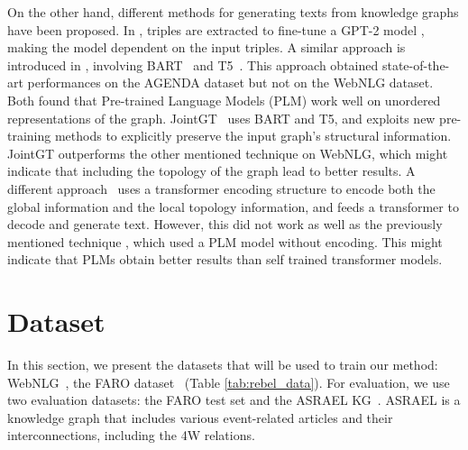 \documentclass[
hf, %
]{ceurart}
\begin{document}
On the other hand, different methods for generating texts from knowledge graphs have been proposed. In \cite{creative_story}, triples are extracted to fine-tune a GPT-2 model \cite{GPT-2}, making the model dependent on the input triples. A similar approach is introduced in \cite{inv_PLM}, involving BART~\cite{BART} and T5~\cite{T5}. This approach obtained state-of-the-art performances on the AGENDA dataset \cite{AGENDA_KG} but not on the WebNLG dataset. Both found that Pre-trained Language Models (PLM) work well on unordered representations of the graph. JointGT~\cite{JointGT} uses BART and T5, and exploits new pre-training methods to explicitly preserve the input graph's structural information. JointGT outperforms the other mentioned technique on WebNLG, which might indicate that including the topology of the graph lead to better results. A different approach~\cite{DRAW} uses a transformer encoding structure to encode both the global information and the local topology information, and feeds a transformer to decode and generate text. However, this did not work as well as the previously mentioned technique \cite{inv_PLM}, which used a PLM model without encoding. This might indicate that PLMs obtain better results than self trained transformer models.

\section{Dataset} 
\label{sec:dataset}
In this section, we present the datasets that will be used to train our method: WebNLG~\cite{WebNLG}, the FARO dataset~\cite{sem_data_aug} (Table \ref{tab:rebel_data}). For evaluation, we use two evaluation datasets: the FARO test set and the ASRAEL KG~\cite{ASRAEL}. ASRAEL is a knowledge graph that includes various event-related articles and their interconnections, including the 4W relations.

\begin{table}[htbp]
\caption{Sample of the FARO dataset}
\label{tab:rebel_data}
\end{table}
\end{document}

